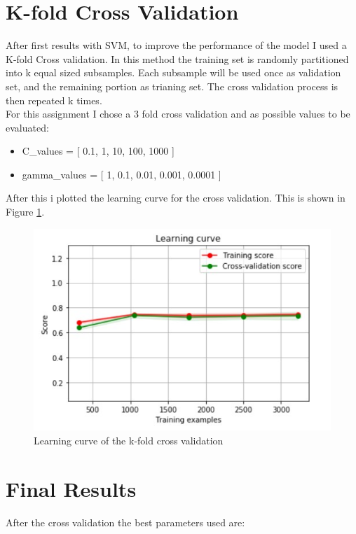 \documentclass{article}
\begin{document}
\section{K-fold Cross Validation}
After first results with SVM, to improve the performance of the model I used a K-fold Cross validation. In this method the training set is randomly partitioned into k equal sized subsamples. Each subsample will be used once as validation set, and the remaining portion as trianing set. The cross validation process is then repeated k times.\\
For this assignment I chose a 3 fold cross validation and as possible values to be evaluated:

\begin{itemize}
    \item C\_values = [ 0.1, 1, 10, 100, 1000 ]  
    \item gamma\_values = [ 1, 0.1, 0.01, 0.001, 0.0001 ]
\end{itemize}

\noindent After this i plotted the learning curve for the cross validation. This is shown in Figure \ref{fig:learning_curve}.

\begin{figure}[ht]
  \includegraphics[width=\linewidth]{images/learning_curve.jpg}
  \caption{Learning curve of the k-fold cross validation}
  \label{fig:learning_curve}
\end{figure}

\section{Final Results}
After the cross validation the best parameters used are:
\end{document}
